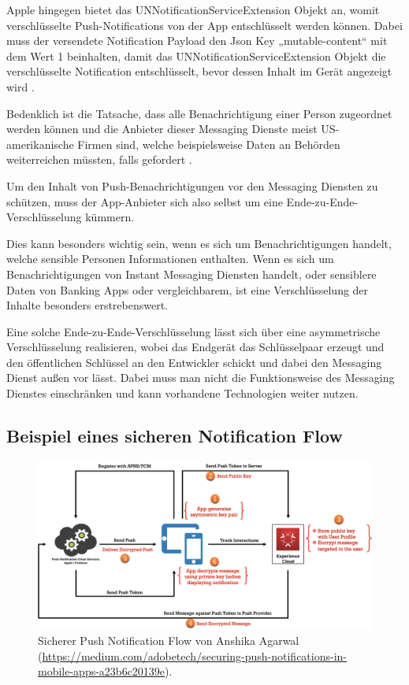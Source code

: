 \documentclass[sigconf]{acmart}
\begin{document}
Apple hingegen bietet das UNNotificationServiceExtension Objekt an, 
womit verschlüsselte Push-Notifications von der App entschlüsselt 
werden können. Dabei muss der versendete Notification Payload den 
Json Key „mutable-content“ mit dem Wert 1 beinhalten, damit das 
UNNotificationServiceExtension Objekt die verschlüsselte Notification 
entschlüsselt, bevor dessen Inhalt im Gerät angezeigt wird \cite{apple1}\cite{apple2}.

Bedenklich ist die Tatsache, dass alle Benachrichtigung 
einer Person zugeordnet werden können und die Anbieter dieser Messaging 
Dienste meist US-amerikanische Firmen sind, welche beispielsweise 
Daten an Behörden weiterreichen müssten, falls gefordert \cite{google2}.

Um den Inhalt von Push-Benachrichtigungen vor den Messaging Diensten 
zu schützen, muss der App-Anbieter sich also selbst um eine 
Ende-zu-Ende-Verschlüsselung kümmern.

Dies kann besonders wichtig sein, wenn es sich um Benachrichtigungen 
handelt, welche sensible Personen Informationen enthalten. Wenn es 
sich um Benachrichtigungen von Instant Messaging Diensten handelt, 
oder sensiblere Daten von Banking Apps oder vergleichbarem, 
ist eine Verschlüsselung der Inhalte besonders erstrebenswert.

Eine solche Ende-zu-Ende-Verschlüsselung lässt sich über eine 
asymmetrische Verschlüsselung realisieren, wobei das 
Endgerät das Schlüsselpaar erzeugt und den öffentlichen Schlüssel an 
den Entwickler schickt und dabei den Messaging Dienst außen vor lässt. 
Dabei muss man nicht die Funktionsweise des Messaging Dienstes 
einschränken und kann vorhandene Technologien weiter nutzen.



\subsection{Beispiel eines sicheren Notification Flow}

\begin{figure}[H]
  \centering
  \includegraphics[width=\linewidth]{sample-secureflow}
  \caption{Sicherer Push Notification Flow von Anshika Agarwal (\url{https://medium.com/adobetech/securing-push-notifications-in-mobile-apps-a23b6c20139e}).}
\end{figure}
\end{document}
